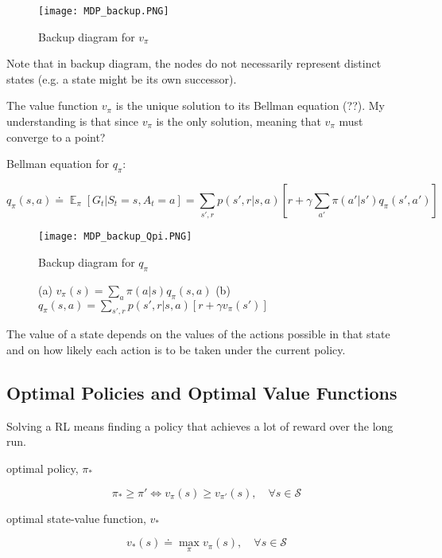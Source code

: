 \documentclass[lang=en,mode=geye,device=normal,color=blue,14pt]{elegantnote}
\DeclareMathOperator*{\E}{\mathbb{E}}
\DeclareMathOperator*{\1}{\mathbbm{1}}
\begin{document}
\begin{figure}[!h]
  \centering
  \texttt{[image: MDP\_backup.PNG]}
  \caption{Backup diagram for $v_\pi$}
  \label{fig:MDP_backup}
\end{figure}
Note that in backup diagram, the nodes do not necessarily represent distinct states (e.g. a state might be its own successor).

The value function $v_\pi$ is the unique solution to its Bellman equation (??). My understanding is that since $v_\pi$ is the only solution, meaning that $v_\pi$ must converge to a point?

\begin{definition}
Bellman equation for $q_\pi$:

$$ q_\pi(s,a) \doteq \E_\pi [G_t | S_t = s, A_t = a] = \sum_{s',r} p(s',r|s,a)[r+\gamma \sum_{a'} \pi(a'|s')q_\pi (s',a')] $$
\end{definition}

\begin{figure}[!h]
  \centering
  \texttt{[image: MDP\_backup\_Qpi.PNG]}
  \caption{Backup diagram for $q_\pi$}
  \label{fig:MDP_backup_qpi}
\end{figure}

\begin{figure}[!h]
    \centering
    \caption{ (a) $ v_\pi(s)=\sum_a \pi(a|s)q_\pi(s,a) $ (b) $ q_\pi(s,a)=\sum_{s',r}p(s',r|s,a)[r+\gamma v_\pi(s')] $ }
    \label{fig:MDPMDP}
\end{figure}
The value of a state depends on the values of the actions possible in that state and on how likely each action is to be taken under the current policy.

\subsection{Optimal Policies and Optimal Value Functions}

Solving a RL means finding a policy that achieves a lot of reward over the long run.

\begin{definition}
optimal policy, $\pi_*$

$$ \pi_* \geq \pi' \iff v_\pi(s) \geq v_{\pi'}(s), \quad \forall s \in \mathcal{S} $$
\end{definition}

\begin{definition}
optimal state-value function, $v_*$

$$ v_*(s) \doteq \max_\pi v_\pi(s), \quad \forall s \in \mathcal{S} $$
\end{definition}
\end{document}
